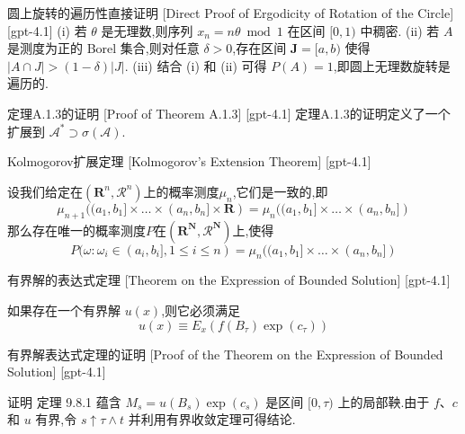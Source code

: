 \documentclass[UTF8]{ctexart}
\begin{document}
    
    
    \begin{thm}
        {圆上旋转的遍历性直接证明}
        [Direct Proof of Ergodicity of Rotation of the Circle]
        [gpt-4.1]
        (i) 若 $\theta$ 是无理数,则序列 $x_n = n\theta \bmod 1$ 在区间 $[0,1)$ 中稠密.
(ii) 若 $A$ 是测度为正的 Borel 集合,则对任意 $\delta > 0$,存在区间 $\boldsymbol{J} = [a, b)$ 使得 $|A \cap J| > (1 - \delta)|J|$.
(iii) 结合 (i) 和 (ii) 可得 $P(A) = 1$,即圆上无理数旋转是遍历的.

    \end{thm}
    
    
    
    \begin{thm}
        {定理A.1.3的证明}
        [Proof of Theorem A.1.3]
        [gpt-4.1]
        定理A.1.3的证明定义了一个扩展到 $\mathcal{A}^* \supset \sigma(\mathcal{A})$.
    \end{thm}
    
    
    
    \begin{thm}
        {Kolmogorov扩展定理}
        [Kolmogorov's Extension Theorem]
        [gpt-4.1]
        
设我们给定在$(\mathbf{R}^{n}, \mathcal{R}^{n})$上的概率测度$\mu_{n}$,它们是一致的,即
\[
\mu_{n+1}((a_{1}, b_{1}] \times \ldots \times (a_{n}, b_{n}] \times \mathbf{R}) = \mu_{n}((a_{1}, b_{1}] \times \ldots \times (a_{n}, b_{n}])
\]
那么存在唯一的概率测度$P$在$(\mathbf{R}^{\mathbf{N}}, \mathcal{R}^{\mathbf{N}})$上,使得
\[
P(\omega : \omega_{i} \in (a_{i}, b_{i}], 1 \le i \le n) = \mu_{n}((a_{1}, b_{1}] \times \ldots \times (a_{n}, b_{n}])
\]

    \end{thm}
    
    
    
    \begin{thm}
        {有界解的表达式定理}
        [Theorem on the Expression of Bounded Solution]
        [gpt-4.1]
        
如果存在一个有界解 $
u(x)$,则它必须满足
\[
u(x) \equiv E_{x} ( f(B_{\tau}) \exp ( c_{\tau} ) )
\]

    \end{thm}
    
    
    
    \begin{prf}
        {有界解表达式定理的证明}
        [Proof of the Theorem on the Expression of Bounded Solution]
        [gpt-4.1]
        
证明 定理 9.8.1 蕴含 $M_{s} = u(B_{s}) \exp ( c_{s} )$ 是区间 $[0, \tau)$ 上的局部鞅.由于 $f$、$c$ 和 $u$ 有界,令 $s \uparrow \tau \wedge t$ 并利用有界收敛定理可得结论.

    \end{prf}
    
\end{document}
